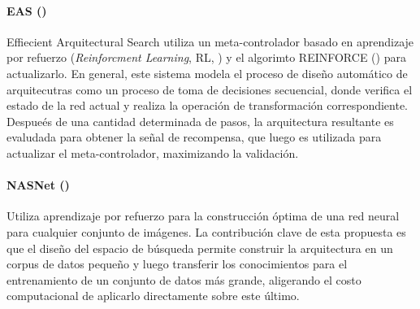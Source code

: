 
\paragraph*{EAS (\cite{cai2018efficient})} Effiecient Arquitectural Search utiliza un meta-controlador basado en aprendizaje por refuerzo (\textit{Reinforcment Learning}, RL, \cite{kaelbling1996reinforcement}) y el algorimto REINFORCE (\cite{williams1992simple}) para actualizarlo. En general, este sistema modela el proceso de dise\~no autom\'atico de arquitecutras como un proceso de toma de decisiones secuencial, donde verifica el estado de la red actual y realiza la operaci\'on de transformaci\'on correspondiente. Despue\'es de una cantidad determinada de pasos, la arquitectura resultante es evaludada para obtener la se\~nal de recompensa, que luego es utilizada para actualizar el meta-controlador, maximizando la validaci\'on.

        \paragraph*{NASNet (\cite{zoph2018learning})} Utiliza aprendizaje por refuerzo para la construcci\'on \'optima de una red neural para cualquier conjunto de im\'agenes. La contribuci\'on clave de esta propuesta es que el diseño del espacio de b\'usqueda permite construir la arquitectura en un corpus de datos peque\~no y luego transferir los conocimientos para el entrenamiento de un conjunto de datos m\'as grande, aligerando el costo computacional de aplicarlo directamente sobre este \'ultimo.



